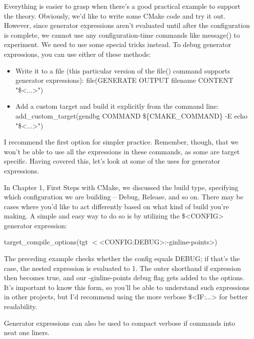 
Everything is easier to grasp when there’s a good practical example to support the theory. Obviously, we’d like to write some CMake code and try it out. However, since generator expressions aren’t evaluated until after the configuration is complete, we cannot use any configuration-time commands like message() to experiment. We need to use some special tricks instead. To debug generator expressions, you can use either of these methods:

\begin{itemize}
\item
Write it to a file (this particular version of the file() command supports generator expressions): file(GENERATE OUTPUT filename CONTENT "\$<...>")

\item
Add a custom target and build it explicitly from the command line: add\_custom\_target(gendbg COMMAND \$\{CMAKE\_COMMAND\} -E echo "\$<...>")
\end{itemize}

I recommend the first option for simpler practice. Remember, though, that we won’t be able to use all the expressions in these commands, as some are target specific. Having covered this, let’s look at some of the uses for generator expressions.


In Chapter 1, First Steps with CMake, we discussed the build type, specifying which configuration we are building – Debug, Release, and so on. There may be cases where you’d like to act differently based on what kind of build you’re making. A simple and easy way to do so is by utilizing the \$<CONFIG> generator expression:

\begin{shell}
target_compile_options(tgt $<$<CONFIG:DEBUG>:-ginline-points>)
\end{shell}

The preceding example checks whether the config equals DEBUG; if that’s the case, the nested expression is evaluated to 1. The outer shorthand if expression then becomes true, and our -ginline-points debug flag gets added to the options. It’s important to know this form, so you’ll be able to understand such expressions in other projects, but I’d recommend using the more verbose \$<IF:...> for better readability.


Generator expressions can also be used to compact verbose if commands into neat one liners.

